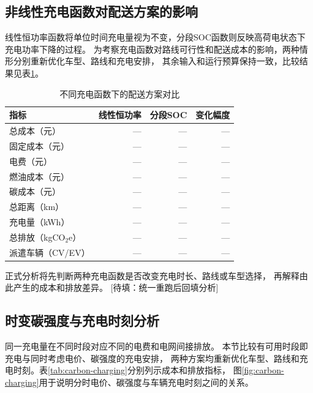 \documentclass{setp-new}
\DeclareRobustCommand{\TBD}[1]{%
  \begingroup\setlength{\fboxsep}{1.2pt}%
  \colorbox{black!12}{\textcolor{black!65}{\textsf{\footnotesize[待填：#1]}}}%
  \endgroup}
\begin{document}
\subsection{非线性充电函数对配送方案的影响}

线性恒功率函数将单位时间充电量视为不变，分段SOC函数则反映高荷电状态下充电功率下降的过程。
为考察充电函数对路线可行性和配送成本的影响，两种情形分别重新优化车型、路线和充电安排，
其余输入和运行预算保持一致，比较结果见表\ref{tab:nonlinear-charging}。

\begin{table}[H]
  \centering
  \caption{不同充电函数下的配送方案对比}
  \label{tab:nonlinear-charging}
  \scriptsize
  \begin{tabular*}{\textwidth}{@{\extracolsep{\fill}}lrrr}
    \toprule
    指标 & 线性恒功率 & 分段SOC & 变化幅度\\
    \midrule
    总成本（元） & --- & --- & ---\\
    固定成本（元） & --- & --- & ---\\
    电费（元） & --- & --- & ---\\
    燃油成本（元） & --- & --- & ---\\
    碳成本（元） & --- & --- & ---\\
    总距离（km） & --- & --- & ---\\
    充电量（kWh） & --- & --- & ---\\
    总排放（kgCO$_2$e） & --- & --- & ---\\
    派遣车辆（CV/EV） & --- & --- & ---\\
    \bottomrule
  \end{tabular*}
\end{table}

正式分析将先判断两种充电函数是否改变充电时长、路线或车型选择，
再解释由此产生的成本和排放差异。\TBD{统一重跑后回填分析}

\subsection{时变碳强度与充电时刻分析}

同一充电量在不同时段对应不同的电费和电网间接排放。
本节比较有可用时段即充电与同时考虑电价、碳强度的充电安排，
两种方案均重新优化车型、路线和充电时刻。表\ref{tab:carbon-charging}分别列示成本和排放指标，
图\ref{fig:carbon-charging}用于说明分时电价、碳强度与车辆充电时刻之间的关系。
\end{document}
